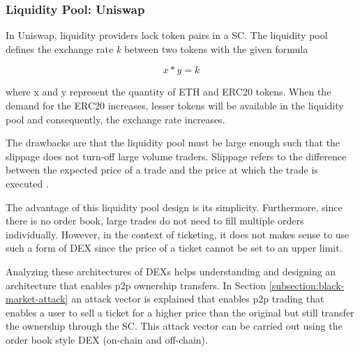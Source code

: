 \subsubsection{Liquidity Pool: Uniswap}

In Uniswap, liquidity providers lock token pairs in a SC. The liquidity pool defines the exchange rate \textit{k} between two tokens with the given formula 

\[ x * y = k \]

where x and y represent the quantity of ETH and ERC20 tokens. When the demand for the ERC20 increases, lesser tokens will be available in the liquidity pool and consequently, the exchange rate increases. 

The drawbacks are that the liquidity pool must be large enough such that the slippage does not turn-off large volume traders. Slippage refers to the difference between the expected price of a trade and the price at which the trade is executed \cite{slippage}. 

The advantage of this liquidity pool design is its simplicity. Furthermore, since there is no order book, large trades do not need to fill multiple orders individually. However, in the context of ticketing, it does not makes sense to use such a form of DEX since the price of a ticket cannot be set to an upper limit. 

Analyzing these architectures of DEXs helps understanding and designing an architecture that enables p2p ownership transfers. In Section \ref{subsection:black-market-attack} an attack vector is explained that enables p2p trading that enables a user to sell a ticket for a higher price than the original but still transfer the ownership through the SC. This attack vector can be carried out using the order book style DEX (on-chain and off-chain). 